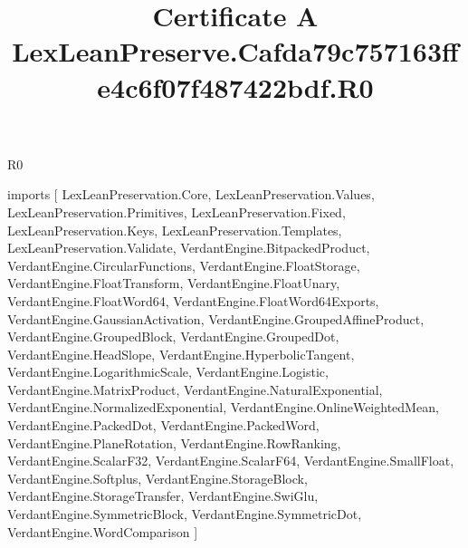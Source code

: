 \begin{lexlean}{R0}
\title{Certificate A LexLeanPreserve.Cafda79c757163ffe4c6f07f487422bdf.R0}
\begin{coremodule}
imports [
  LexLeanPreservation.Core,
  LexLeanPreservation.Values,
  LexLeanPreservation.Primitives,
  LexLeanPreservation.Fixed,
  LexLeanPreservation.Keys,
  LexLeanPreservation.Templates,
  LexLeanPreservation.Validate,
  VerdantEngine.BitpackedProduct,
  VerdantEngine.CircularFunctions,
  VerdantEngine.FloatStorage,
  VerdantEngine.FloatTransform,
  VerdantEngine.FloatUnary,
  VerdantEngine.FloatWord64,
  VerdantEngine.FloatWord64Exports,
  VerdantEngine.GaussianActivation,
  VerdantEngine.GroupedAffineProduct,
  VerdantEngine.GroupedBlock,
  VerdantEngine.GroupedDot,
  VerdantEngine.HeadSlope,
  VerdantEngine.HyperbolicTangent,
  VerdantEngine.LogarithmicScale,
  VerdantEngine.Logistic,
  VerdantEngine.MatrixProduct,
  VerdantEngine.NaturalExponential,
  VerdantEngine.NormalizedExponential,
  VerdantEngine.OnlineWeightedMean,
  VerdantEngine.PackedDot,
  VerdantEngine.PackedWord,
  VerdantEngine.PlaneRotation,
  VerdantEngine.RowRanking,
  VerdantEngine.ScalarF32,
  VerdantEngine.ScalarF64,
  VerdantEngine.SmallFloat,
  VerdantEngine.Softplus,
  VerdantEngine.StorageBlock,
  VerdantEngine.StorageTransfer,
  VerdantEngine.SwiGlu,
  VerdantEngine.SymmetricBlock,
  VerdantEngine.SymmetricDot,
  VerdantEngine.WordComparison
]


\end{coremodule}
\end{lexlean}
